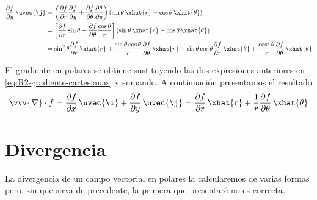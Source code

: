 {\small
  \begin{subequations}
    \begin{align*}
      \dfrac{\partial f}{\partial y}\,\uvec{\j}
      &=
        \left(%
        \dfrac{\partial f}{\partial r}\dfrac{\partial f}{\partial y}
        + \dfrac{\partial f}{\partial\theta}\dfrac{\partial\theta}{\partial y}
        \right)
        \left(%
        \sin\theta\,\xhat{r}-\cos\theta\,\xhat{\theta}
        \right)\\
      &=
        \left[%
        \dfrac{\partial f}{\partial r}\sin\theta
        + \dfrac{\partial f}{\partial\theta}\dfrac{\cos\theta}{r}
        \right]
        \left(%
        \sin\theta\,\xhat{r} - \cos\theta\,\xhat{\theta}
        \right)\\
      &=
        \sin^2\theta\dfrac{\partial f}{\partial r}\,\xhat{r}
        + \dfrac{\sin\theta\cos\theta}{r}\dfrac{\partial f}{\partial\theta}\,\xhat{r}
        + \sin\theta\cos\theta\dfrac{\partial f}{\partial r}\,\xhat{\theta}
        + \dfrac{\cos^2\theta}{r}\dfrac{\partial f}{\partial\theta}\,\xhat{\theta}
    \end{align*}
  \end{subequations}
}

El gradiente en polares se obtiene sustituyendo las dos expresiones anteriores en
\eqref{eq:R2-gradiente-cartesianas} y sumando. A continuación presentamos el resultado
{\small
  \begin{equation}\label{eq:R2-gradiente-polares}
    \vvv{\nabla}\cdot f
    =
      \dfrac{\partial f}{\partial x}\,\uvec{\i}
      + \dfrac{\partial f}{\partial y}\,\uvec{\j}
      = \dfrac{\partial f}{\partial r}\,\xhat{r}
      + \dfrac{1}{r}\dfrac{\partial f}{\partial\theta}\,\xhat{\theta}
  \end{equation}
}

\section{Divergencia}
La divergencia de un campo vectorial en polares la calcularemos de varias formas pero,
sin que sirva de precedente, la primera que presentaré no es correcta.


